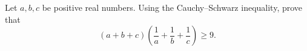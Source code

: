 Let $a,b,c$ be positive real numbers. Using the Cauchy--Schwarz inequality, prove that
\[(a+b+c)\left(\dfrac{1}{a}+\dfrac{1}{b}+\dfrac{1}{c}\right)\ge9 .\]
